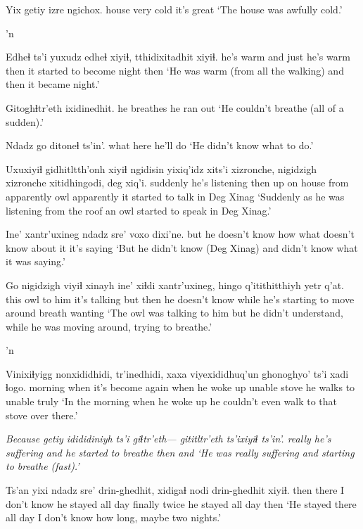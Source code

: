 \documentclass[12pt]{article}
\begin{document}
\gll Yix getiy izre ngichox.
house very cold {it's great}
\glt `The house was awfully cold.'
\glend

'n

\gll Edheɬ ts'i yuxudz edheɬ xiyiɬ, tthidixitadhit xiyiɬ.
{he's warm} and  just {he's warm} then  {it started to become night} then
\glt `He was warm (from all the walking) and then it became night.'
\glend

\gll Gitoghɬtr'eth ixidinedhit. 
{he breathes}  {he ran out}
\glt `He couldn't breathe (all of a sudden).'
\glend

\gll Ndadz go ditoneɬ ts'in'.
what  here {he'll do }
\glt `He didn't know what to do.'
\glend

\gll Uxuxiyiɬ gidhitltth'onh xiyiɬ ngidisin yixiq'idz    xits'i xizronche, nigidzigh xizronche  xitidhingodi,      {deg xiq'i.}
suddenly {he's listening} then  up     {on house} from    apparently owl       apparently {it started to talk} {in Deg Xinag}
\glt `Suddenly as he was listening from the roof an owl started to speak in Deg Xinag.'
\glend

\gll Ine' xantr'uxineg    ndadz sre'   voxo  dixi'ne. 
but  {he doesn't know how} what {doesn't know} {about it} {it's saying}
\glt `But he didn't know (Deg Xinag) and didn't know what it was saying.'
\glend

\gll Go   nigidzigh viyiɬ  xinayh ine' xiɬdi xantr'uxineg, hingo q'itithitthiyh yetr q'at.
this owl       {to him} {it's talking} but then  {he doesn't know} while {he's starting to move around} breath wanting
\glt `The owl was talking to him but he didn't understand, while he was moving around, trying to breathe.'
\glend

'n

\gll Vinixiɬyigg nonxididhidi,     tr'inedhidi, xaxa   viyexididhuq'un ghonoghyo' ts'i xadi   ɬogo. 
morning    {when it's become again} {when he woke up} unable stove           {he walks to} {} unable truly
\glt `In the morning when he woke up  he couldn't even walk to that stove over there.'
\glend

\gll \em Because \em getiy idididiniyh ts'i giɬtr'eth--- gititltr'eth ts'ixiyiɬ ts'in'. 
{} really  {he's suffering} and {} {he started to breathe} then and
\glt `He was really suffering and starting to breathe (fast).'
\glend

\gll Ts'an yixi {ndadz sre'} drin-ghedhit, xidigaɬ nodi drin-ghedhit xiyiɬ.
then  there {I don't know} {he stayed all day} finally twice {he stayed all day} then
\glt `He stayed there all day I don't know how long, maybe two nights.'
\glend
\end{document}
